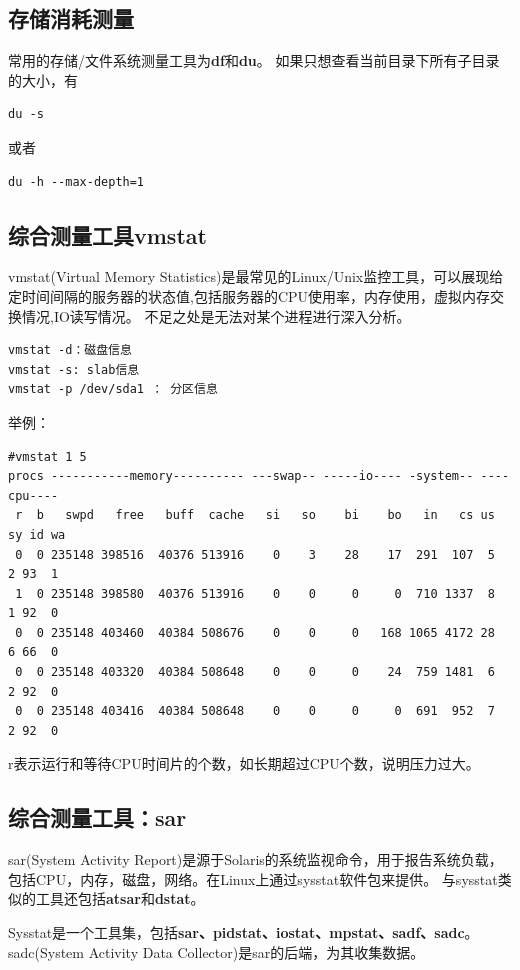  
\subsection{存储消耗测量}
常用的存储/文件系统测量工具为\textbf{df}和\textbf{du}。
 如果只想查看当前目录下所有子目录的大小，有
\begin{verbatim}
du -s
\end{verbatim}
或者
\begin{verbatim}
du -h --max-depth=1
\end{verbatim}



\subsection{综合测量工具vmstat}
vmstat(Virtual Memory Statistics)是最常见的Linux/Unix监控工具，可以展现给定时间间隔的服务器的状态值,包括服务器的CPU使用率，内存使用，虚拟内存交换情况,IO读写情况。
不足之处是无法对某个进程进行深入分析。

\begin{verbatim}
vmstat -d：磁盘信息
vmstat -s: slab信息
vmstat -p /dev/sda1 ： 分区信息
\end{verbatim}

举例：
\begin{verbatim}
#vmstat 1 5
procs -----------memory---------- ---swap-- -----io---- -system-- ----cpu----
 r  b   swpd   free   buff  cache   si   so    bi    bo   in   cs us sy id wa
 0  0 235148 398516  40376 513916    0    3    28    17  291  107  5  2 93  1
 1  0 235148 398580  40376 513916    0    0     0     0  710 1337  8  1 92  0
 0  0 235148 403460  40384 508676    0    0     0   168 1065 4172 28  6 66  0
 0  0 235148 403320  40384 508648    0    0     0    24  759 1481  6  2 92  0
 0  0 235148 403416  40384 508648    0    0     0     0  691  952  7  2 92  0
\end{verbatim}
r表示运行和等待CPU时间片的个数，如长期超过CPU个数，说明压力过大。

\subsection{综合测量工具：sar}
sar(System Activity Report)是源于Solaris的系统监视命令，用于报告系统负载，包括CPU，内存，磁盘，网络\cite{wikipedia}。在Linux上通过sysstat软件包来提供。
与sysstat类似的工具还包括\textbf{atsar}和\textbf{dstat}。

Sysstat是一个工具集，包括\textbf{sar、pidstat、iostat、mpstat、sadf、sadc}。sadc(System Activity Data Collector)是sar的后端，为其收集数据。


